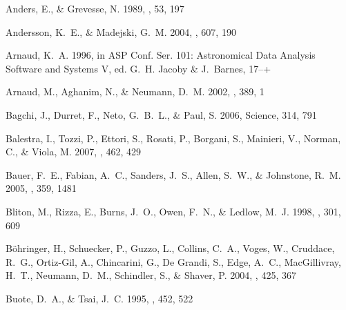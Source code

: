 \documentclass[12pt,preprint]{aastex}
\begin{document}
\begin{thebibliography}{} %

{Anders}, E., \& {Grevesse}, N. 1989, \gca, 53, 197

{Andersson}, K.~E., \& {Madejski}, G.~M. 2004, \apj, 607, 190

{Arnaud}, K.~A. 1996, in ASP Conf. Ser. 101: Astronomical Data Analysis
  Software and Systems V, ed. G.~H. {Jacoby} \& J.~{Barnes}, 17--+

{Arnaud}, M., {Aghanim}, N., \& {Neumann}, D.~M. 2002, \aap, 389, 1

{Bagchi}, J., {Durret}, F., {Neto}, G.~B.~L., \& {Paul}, S. 2006, Science, 314,
  791

{Balestra}, I., {Tozzi}, P., {Ettori}, S., {Rosati}, P., {Borgani}, S.,
  {Mainieri}, V., {Norman}, C., \& {Viola}, M. 2007, \aap, 462, 429

{Bauer}, F.~E., {Fabian}, A.~C., {Sanders}, J.~S., {Allen}, S.~W., \&
  {Johnstone}, R.~M. 2005, \mnras, 359, 1481

{Bliton}, M., {Rizza}, E., {Burns}, J.~O., {Owen}, F.~N., \& {Ledlow}, M.~J.
  1998, \mnras, 301, 609

{B{\"o}hringer}, H., {Schuecker}, P., {Guzzo}, L., {Collins}, C.~A., {Voges},
  W., {Cruddace}, R.~G., {Ortiz-Gil}, A., {Chincarini}, G., {De Grandi}, S.,
  {Edge}, A.~C., {MacGillivray}, H.~T., {Neumann}, D.~M., {Schindler}, S., \&
  {Shaver}, P. 2004, \aap, 425, 367

{Buote}, D.~A., \& {Tsai}, J.~C. 1995, \apj, 452, 522


\end{thebibliography}
\end{document}
